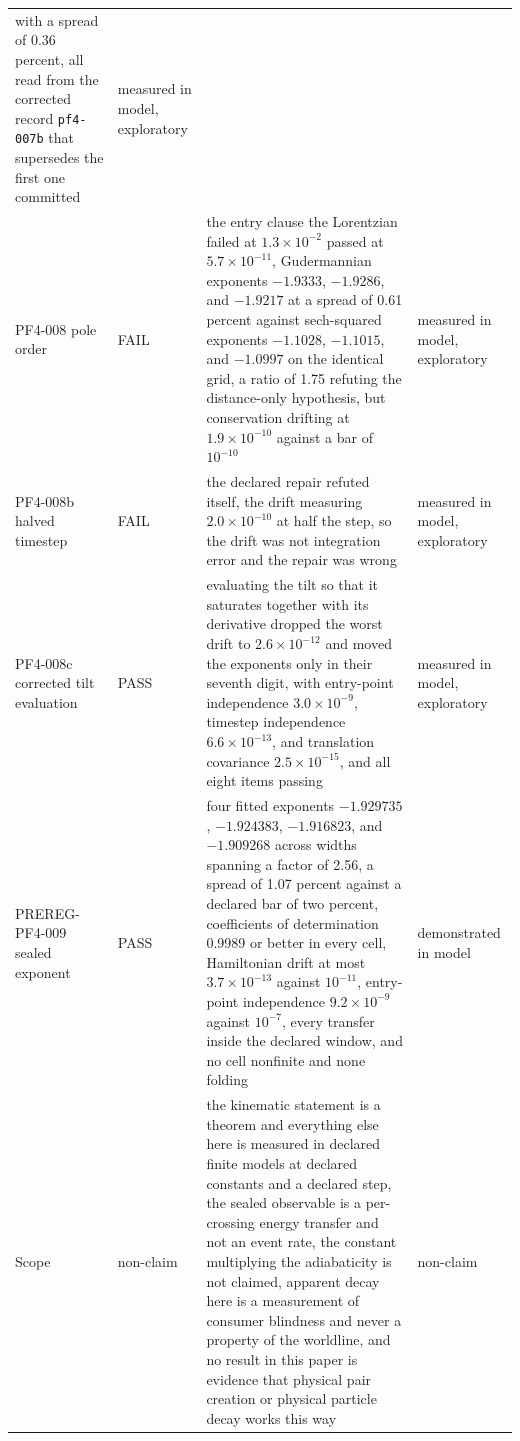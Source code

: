 \documentclass[aps,pre,reprint,nofootinbib,floatfix]{revtex4-2}
\begin{document}
\begin{table}[p]
\begin{ruledtabular}
\begin{tabular}{L{2.5cm}lL{9.4cm}L{3.0cm}}
with a spread of 0.36 percent, all read from the corrected record
\texttt{pf4-007b} that supersedes the first one committed & measured in
model, exploratory \\
PF4-008 pole order & FAIL & the entry clause the Lorentzian failed at
$1.3\times10^{-2}$ passed at $5.7\times10^{-11}$, Gudermannian
exponents $-1.9333$, $-1.9286$, and $-1.9217$ at a spread of 0.61
percent against sech-squared exponents $-1.1028$, $-1.1015$, and
$-1.0997$ on the identical grid, a ratio of 1.75 refuting the
distance-only hypothesis, but conservation drifting at
$1.9\times10^{-10}$ against a bar of $10^{-10}$ & measured in model,
exploratory \\
PF4-008b halved timestep & FAIL & the declared repair refuted itself,
the drift measuring $2.0\times10^{-10}$ at half the step, so the drift
was not integration error and the repair was wrong & measured in model,
exploratory \\
PF4-008c corrected tilt evaluation & PASS & evaluating the tilt so that
it saturates together with its derivative dropped the worst drift to
$2.6\times10^{-12}$ and moved the exponents only in their seventh
digit, with entry-point independence $3.0\times10^{-9}$, timestep
independence $6.6\times10^{-13}$, and translation covariance
$2.5\times10^{-15}$, and all eight items passing & measured in model,
exploratory \\
PREREG-PF4-009 sealed exponent & PASS & four fitted exponents
$-1.929735$, $-1.924383$, $-1.916823$, and $-1.909268$ across widths
spanning a factor of 2.56, a spread of 1.07 percent against a declared
bar of two percent, coefficients of determination 0.9989 or better in
every cell, Hamiltonian drift at most $3.7\times10^{-13}$ against
$10^{-11}$, entry-point independence $9.2\times10^{-9}$ against
$10^{-7}$, every transfer inside the declared window, and no cell
nonfinite and none folding & demonstrated in model \\
Scope & non-claim & the kinematic statement is a theorem and everything
else here is measured in declared finite models at declared constants
and a declared step, the sealed observable is a per-crossing energy
transfer and not an event rate, the constant multiplying the
adiabaticity is not claimed, apparent decay here is a measurement of
consumer blindness and never a property of the worldline, and no result
in this paper is evidence that physical pair creation or physical
particle decay works this way & non-claim \\
\end{tabular}
\end{ruledtabular}
\end{table}
\end{document}
